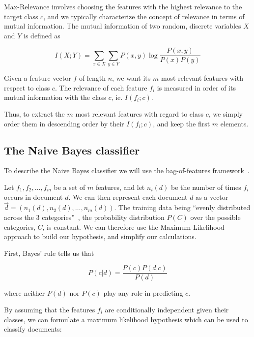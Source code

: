 Max-Relevance involves choosing the features with the highest relevance to the target class $c$, and we typically characterize the concept of relevance in terms of mutual information. The mutual information of two random, discrete variables $X$ and $Y$ is defined as

\begin{equation}
  I(X; Y) = \sum_{x \in X} \sum_{y \in Y} P(x, y) \log \frac{P(x, y)}{P(x) P(y)}
  \label{eq:mutual_information}
\end{equation}

Given a feature vector $f$ of length $n$, we want its $m$ most relevant features with respect to class $c$. The relevance of each feature $f_i$ is measured in order of its mutual information with the class $c$, ie. $I(f_i; c)$.

Thus, to extract the $m$ most relevant features with regard to class $c$, we simply order them in descending order by their $I(f_i; c)$, and keep the first $m$ elements.


\subsection{The Naive Bayes classifier}
\label{ssec:nb_classifier}

To describe the Naive Bayes classifier we will use the bag-of-features framework~\cite{pang2002thumbs}.

Let ${f_1, f_2, \dotsc, f_m}$ be a set of $m$ features, and let $n_i(d)$ be the number of times $f_i$ occurs in document $d$. We can then represent each document $d$ as a vector $\vec{d} = (n_1(d), n_2(d), \dotsc, n_m(d))$. The training data being ``evenly distributed across the 3 categories''~\cite{DatumBoxTwitterSentiment}, the probability distribution $P(C)$ over the possible categories, $C$, is constant. We can therefore use the Maximum Likelihood approach to build our hypothesis, and simplify our calculations.

First, Bayes' rule tells us that

\begin{equation}
  P(c | d) = \frac{P(c) P(d | c)}{P(d)}
\end{equation}

where neither $P(d)$ nor $P(c)$ play any role in predicting $c$.

By assuming that the features $f_i$ are conditionally independent given their classes, we can formulate a maximum likelihood hypothesis which can be used to classify documents:

